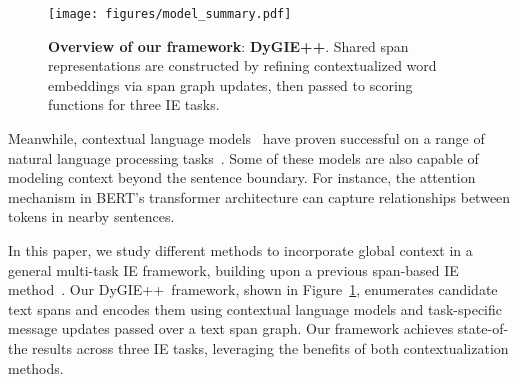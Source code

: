 \documentclass[11pt,a4paper]{article}
\newcommand{\ours}{{\sc DyGIE++}}
\begin{document}
\begin{figure}[t]
  \centering
  \texttt{[image: figures/model\_summary.pdf]}
  \caption{
    \textbf{Overview of our framework}: {\sc \textbf{DyGIE++}}. Shared span representations are constructed by refining contextualized word embeddings via span graph updates, then passed to scoring functions for three IE tasks.
  }
  \label{fig:model}
  \vspace{-1em}
\end{figure} 
Meanwhile, contextual language models~\cite{dai2015semi,peters2017semi, peters2018deep, devlin2019bert} have proven successful on a range of natural language processing tasks~\cite{bowman2015large, sang2003introduction, rajpurkar2016squad}. 
Some of these models are also capable of modeling context beyond the sentence boundary. For instance, the attention mechanism in BERT's transformer architecture can capture relationships between tokens in nearby sentences. 

In this paper, we study different methods to incorporate global context in a general multi-task IE framework, building upon a previous span-based IE method~\cite{luan2019general}. Our \ours\ framework, shown in Figure~\ref{fig:model}, enumerates candidate text spans and encodes them using contextual language models and task-specific message updates passed over a text span graph.  Our framework achieves state-of-the results across three IE tasks, leveraging the benefits of both contextualization methods.  
\end{document}
